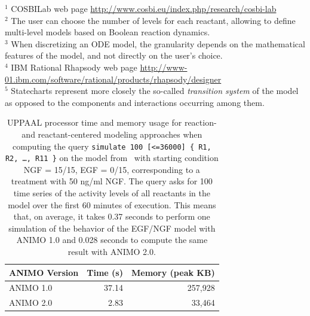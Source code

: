 \documentclass{bmcart}
\begin{document}
\begin{backmatter}
\begin{table}[!hbt]
\begin{minipage}{\textwidth}
{\scriptsize $^1$ {COSBILab} web page \url{http://www.cosbi.eu/index.php/research/cosbi-lab}\\
$^2$ The user can choose the number of levels for each reactant, allowing to define
multi-level models based on Boolean reaction dynamics.\\
$^3$ When discretizing an ODE model, the granularity depends on the mathematical
features of the model, and not directly on the user's choice.\\
$^4$ {IBM Rational Rhapsody} web page \url{http://www-01.ibm.com/software/rational/products/rhapsody/designer}\\
$^5$ Statecharts represent more closely the so-called
\emph{transition system} of the model as opposed to the components and interactions occurring among them.}
\end{minipage}
\end{table}



\begin{table}[h!]
\scriptsize
  \begin{center}
  \begin{tabular}{|l||r|r|}
    \hline
    ANIMO Version & Time (s) & Memory (peak KB) \\
    \hline
    \hline
    ANIMO 1.0 & 37.14 & 257,928 \\
    \hline
    ANIMO 2.0 & 2.83 & 33,464 \\
    \hline
  \end{tabular}
  \end{center}
  \caption{UPPAAL processor time and memory usage for reaction- and reactant-centered modeling approaches when computing
  the query {\tt simulate 100 [<=36000] \{ R1, R2, \dots, R11 \}} on the model from~\cite{animo-bibe} with starting condition
  NGF = 15/15, EGF = 0/15, corresponding to a treatment with 50 ng/ml NGF.
  The query asks for 100 time series of the activity levels of all reactants in the model over the first 60 minutes
  of execution. This means that, on average, it takes 0.37 seconds to perform one simulation of the behavior
  of the EGF/NGF model with ANIMO 1.0 and 0.028 seconds to compute the same result with ANIMO 2.0.\label{tab:sim-100}}
\end{table}




\end{backmatter}
\end{document}
